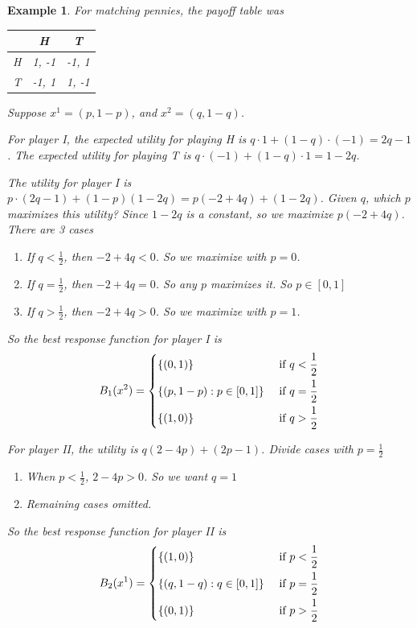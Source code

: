 \documentclass[twoside]{article}
\newtheorem{protoexample}[prototheorem]{Example}
\newenvironment{example}
{\colorlet{shadecolor}{red!15}\begin{shaded}\begin{protoexample}\normalfont}
		{\end{protoexample}\end{shaded}}
\begin{document}
\begin{example}
	For matching pennies, the payoff table was
	\begin{center}
		\begin{tabular}{|c|c|c|}
			\hline
			  & H     & T     \\
			\hline
			H & 1, -1 & -1, 1 \\
			\hline
			T & -1, 1 & 1, -1 \\
			\hline
		\end{tabular}
	\end{center}
	Suppose $x^1 = (p, 1-p)$, and $x^2 = (q, 1-q)$.
	
	For player I, the expected utility for playing H is $q \cdot 1 + (1-q) \cdot (-1) = 2q-1$. The expected utility for playing T is $q \cdot (-1) + (1-q) \cdot 1 = 1 - 2q$. 
	
	The utility for player I is $p\cdot (2q-1) + (1-p)(1-2q) = p(-2+4q) + (1-2q)$. Given $q$, which $p$ maximizes this utility? Since $1-2q$ is a constant, so we maximize $p(-2+4q)$. There are 3 cases \begin{enumerate}
	\item If $q < \frac{1}{2}$, then $-2+4q < 0$. So we maximize with $p = 0$. 
	\item If $q = \frac{1}{2}$, then $-2+4q = 0$. So any $p$ maximizes it. So $p \in [0, 1]$
	\item If $q > \frac{1}{2}$, then $-2+4q > 0$. So we maximize with $p = 1$. 
	\end{enumerate}
	
	So the best response function for player I is $$B_1(x^2) = \begin{dcases}
	\{(0, 1)\} & \text{ if } q < \frac{1}{2}\\
	\{(p, 1-p) : p \in [0, 1]\} & \text{ if } q = \frac{1}{2}\\
	\{(1, 0)\} & \text{ if } q > \frac{1}{2}\\
	\end{dcases}$$
	
	For player II, the utility is $q(2-4p) + (2p-1)$. Divide cases with $p = \frac{1}{2}$\begin{enumerate}
	\item When $p < \frac{1}{2}$, $2-4p > 0$. So we want $q =1$
	\item Remaining cases omitted.
	\end{enumerate}
	
	So the best response function for player II is $$B_2(x^1) = \begin{dcases}
	\{(1, 0)\} & \text{ if } p < \frac{1}{2}\\
	\{(q, 1-q) : q \in [0, 1]\} & \text{ if } p = \frac{1}{2}\\
	\{(0, 1)\} & \text{ if } p > \frac{1}{2}\\
	\end{dcases}$$
	

\end{example}
\end{document}
